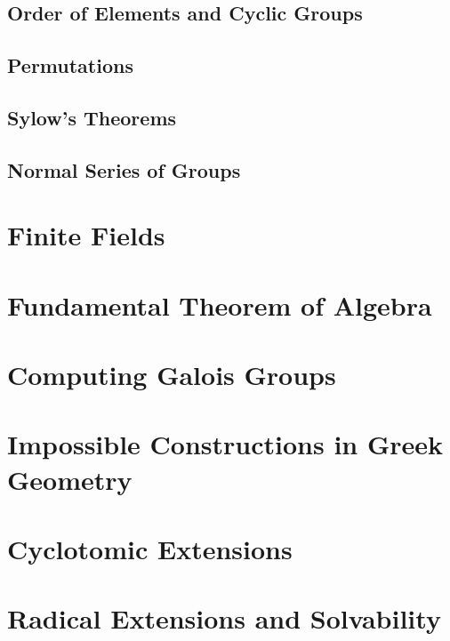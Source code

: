 \documentclass[oneside]{book}
\theoremstyle{lemmastyle}
\theoremstyle{definitionstyle}
\theoremstyle{exercisestyle}
\theoremstyle{claimstyle}
\newcommand{\<}{\langle}
\renewcommand{\>}{\rangle}
\begin{document}
        \section{Order of Elements and Cyclic Groups}
            
        
        \section{Permutations}
            
        
        \section{Sylow's Theorems}
            
            
        \section{Normal Series of Groups}
            
            
    \chapter{Finite Fields}
        
    
    \chapter{Fundamental Theorem of Algebra}
        
    
    \chapter{Computing Galois Groups}
        
    
    \chapter{Impossible Constructions in Greek Geometry}
        
    
    \chapter{Cyclotomic Extensions}
        

    \chapter{Radical Extensions and Solvability}
        

    
\end{document}
